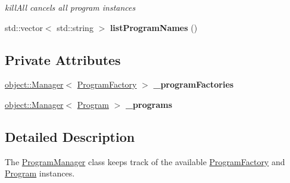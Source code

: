 \begin{DoxyCompactItemize}
\begin{DoxyCompactList}\small\item\em kill\-All cancels all program instances \end{DoxyCompactList}\item 
\hypertarget{classdrobot_1_1program_1_1ProgramManager_ad8d36ca3ae149a35055ec65b86a88f2a}{std\-::vector$<$ std\-::string $>$ {\bfseries list\-Program\-Names} ()}\label{classdrobot_1_1program_1_1ProgramManager_ad8d36ca3ae149a35055ec65b86a88f2a}

\end{DoxyCompactItemize}
\subsection*{Private Attributes}
\begin{DoxyCompactItemize}
\item 
\hypertarget{classdrobot_1_1program_1_1ProgramManager_a044432fd5e26ef8f9170d2b6ab726829}{\hyperlink{classdrobot_1_1object_1_1Manager}{object\-::\-Manager}$<$ \hyperlink{classdrobot_1_1program_1_1ProgramFactory}{Program\-Factory} $>$ {\bfseries \-\_\-program\-Factories}}\label{classdrobot_1_1program_1_1ProgramManager_a044432fd5e26ef8f9170d2b6ab726829}

\item 
\hypertarget{classdrobot_1_1program_1_1ProgramManager_a8bf1519b4720d837256c3bb139e56dff}{\hyperlink{classdrobot_1_1object_1_1Manager}{object\-::\-Manager}$<$ \hyperlink{classdrobot_1_1program_1_1Program}{Program} $>$ {\bfseries \-\_\-programs}}\label{classdrobot_1_1program_1_1ProgramManager_a8bf1519b4720d837256c3bb139e56dff}

\end{DoxyCompactItemize}


\subsection{Detailed Description}
The \hyperlink{classdrobot_1_1program_1_1ProgramManager}{Program\-Manager} class keeps track of the available \hyperlink{classdrobot_1_1program_1_1ProgramFactory}{Program\-Factory} and \hyperlink{classdrobot_1_1program_1_1Program}{Program} instances. 


